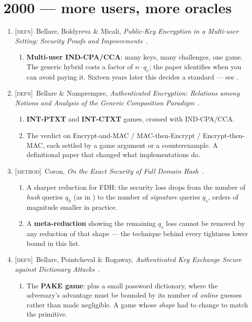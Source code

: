 \documentclass[11pt]{article}
\newcommand{\kind}[1]{{\footnotesize\textsc{\textcolor{yearcolor}{[#1]}}}\ }
\newcommand{\defn}{\kind{defn}}
\newcommand{\method}{\kind{method}}
\newcommand{\paper}[3]{#1, \emph{#2}~\cite{#3}.}
\begin{document}
\section{2000 --- more users, more oracles}

\begin{enumerate}
  \item \defn \paper{Bellare, Boldyreva \& Micali}{Public-Key Encryption in a
    Multi-user Setting: Security Proofs and Improvements}{BBM00}
    \begin{enumerate}
      \item \textbf{Multi-user IND-CPA/CCA}: many keys, many challenges, one
        game. The generic hybrid costs a factor of $n \cdot q_e$; the paper
        identifies when you can avoid paying it. Sixteen years later this
        decides a standard --- see \cite{BT16}.
    \end{enumerate}

  \item \defn \paper{Bellare \& Namprempre}{Authenticated Encryption: Relations
    among Notions and Analysis of the Generic Composition Paradigm}{BN00}
    \begin{enumerate}
      \item \textbf{INT-PTXT} and \textbf{INT-CTXT} games, crossed with
        IND-CPA/CCA.
      \item The verdict on Encrypt-and-MAC / MAC-then-Encrypt /
        Encrypt-then-MAC, each settled by a game argument or a counterexample.
        A definitional paper that changed what implementations do.
    \end{enumerate}

  \item \method \paper{Coron}{On the Exact Security of Full Domain Hash}{Cor00}
    \begin{enumerate}
      \item A sharper reduction for FDH: the security loss drops from the
        number of \emph{hash} queries $q_h$ (as in \cite{BR96}) to the number of
        \emph{signature} queries $q_s$, orders of magnitude smaller in practice.
      \item A \textbf{meta-reduction} showing the remaining $q_s$ loss cannot be
        removed by any reduction of that shape --- the technique behind every
        tightness lower bound in this list.
    \end{enumerate}

  \item \defn \paper{Bellare, Pointcheval \& Rogaway}{Authenticated Key Exchange
    Secure against Dictionary Attacks}{BPR00}
    \begin{enumerate}
      \item The \textbf{PAKE game}: \cite{BR93ke} plus a small password
        dictionary, where the adversary's advantage must be bounded by its
        number of \emph{online} guesses rather than made negligible. A game
        whose \emph{shape} had to change to match the primitive.
    \end{enumerate}
\end{enumerate}
\end{document}

